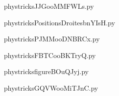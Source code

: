     \newcommand{\CaptionFigJJGooMMFWLs}{<+Type your caption here+>}
    \begin{center}
        
    \end{center}
    phystricksJJGooMMFWLs.py

    

    \clearpage
    


    \newcommand{\CaptionFigPositionsDroitesbnYIsH}{<+Type your caption here+>}
    \begin{center}
        
    \end{center}
    phystricksPositionsDroitesbnYIsH.py

    

    \clearpage
    


    \newcommand{\CaptionFigPJMMooDNBRCx}{<+Type your caption here+>}
    \begin{center}
        
    \end{center}
    phystricksPJMMooDNBRCx.py

    

    \clearpage
    


    \newcommand{\CaptionFigFBTCooBKTryQ}{<+Type your caption here+>}
    \begin{center}
        
    \end{center}
    phystricksFBTCooBKTryQ.py

    

    \clearpage
    


    \newcommand{\CaptionFigfigureBOuQJyj}{<+Type your caption here+>}
    \begin{center}
        
    \end{center}
    phystricksfigureBOuQJyj.py

    

    \clearpage
    


    \newcommand{\CaptionFigGQVWooMiTJnC}{<+Type your caption here+>}
    \begin{center}
        
    \end{center}
    phystricksGQVWooMiTJnC.py


